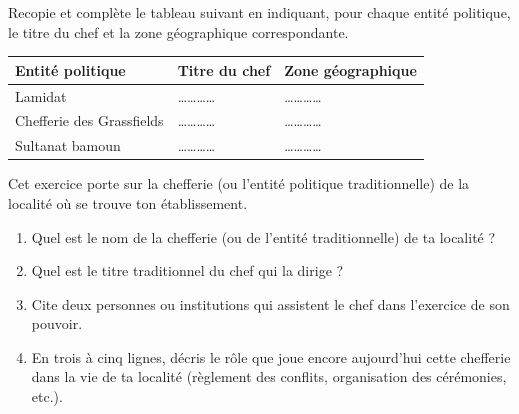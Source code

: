 \documentclass[11pt]{article}
\begin{document}
\begin{exercice}
Recopie et complète le tableau suivant en indiquant, pour chaque entité politique, le titre du chef et la zone géographique correspondante.

\begin{center}
\begin{tabular}{|l|l|l|}
\hline
\textbf{Entité politique} & \textbf{Titre du chef} & \textbf{Zone géographique} \\
\hline
Lamidat & \ldots\ldots\ldots\ldots & \ldots\ldots\ldots\ldots \\
\hline
Chefferie des Grassfields & \ldots\ldots\ldots\ldots & \ldots\ldots\ldots\ldots \\
\hline
Sultanat bamoun & \ldots\ldots\ldots\ldots & \ldots\ldots\ldots\ldots \\
\hline
\end{tabular}
\end{center}
\end{exercice}

\begin{exercice}
Cet exercice porte sur la chefferie (ou l'entité politique traditionnelle) de la localité où se trouve ton établissement.
\begin{enumerate}
\item Quel est le nom de la chefferie (ou de l'entité traditionnelle) de ta localité ?
\item Quel est le titre traditionnel du chef qui la dirige ?
\item Cite deux personnes ou institutions qui assistent le chef dans l'exercice de son pouvoir.
\item En trois à cinq lignes, décris le rôle que joue encore aujourd'hui cette chefferie dans la vie de ta localité (règlement des conflits, organisation des cérémonies, etc.).
\end{enumerate}
\end{exercice}
\end{document}
